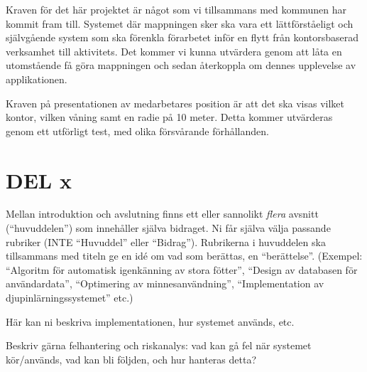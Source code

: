\documentclass[a4paper,12pt]{article}
\begin{document}
%
%
%
%
%
Kraven för det här projektet är något som vi tillsammans med kommunen har kommit fram till. Systemet där mappningen sker ska vara ett lättförståeligt och självgående system som ska förenkla förarbetet inför en flytt från kontorsbaserad verksamhet till aktivitets. Det kommer vi kunna utvärdera genom att låta en utomstående få göra mappningen och sedan återkoppla om dennes upplevelse av applikationen.

Kraven på presentationen av medarbetares position är att det ska visas vilket kontor, vilken våning samt en radie på 10 meter. Detta kommer utvärderas genom ett utförligt test, med olika försvårande förhållanden.



\section{DEL x}\label{sec:delX}
Mellan introduktion och avslutning finns ett eller sannolikt \emph{flera} avsnitt (``huvuddelen'') som innehåller själva bidraget.  Ni får själva välja passande rubriker (INTE ``Huvuddel'' eller ``Bidrag'').  Rubrikerna i huvuddelen ska tillsammans med titeln ge en idé om vad som berättas, en ``berättelse''. (Exempel: ``Algoritm för automatisk igenkänning av stora fötter'', ``Design av databasen för användardata'', ``Optimering av minnesanvändning'', ``Implementation av djupinlärningssystemet'' etc.)

Här kan ni beskriva implementationen, hur systemet används, etc.

Beskriv gärna felhantering och riskanalys: vad kan gå fel när systemet kör/används, vad kan bli följden, och hur hanteras detta?
\end{document}
